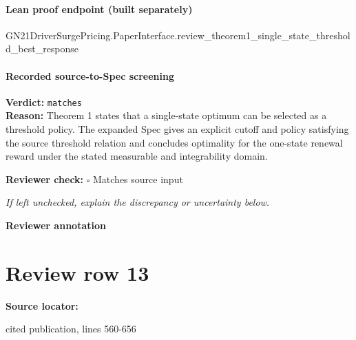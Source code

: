 \documentclass[10pt]{article}
\newcommand{\reviewerbox}{%
  \par\noindent\fbox{\parbox{0.96\linewidth}{\rule{0pt}{0.38in}}}\par
}
\newcommand{\reviewmatch}[1]{%
  \par\noindent\textbf{Reviewer check:} $\square$\; #1\par
  \noindent\emph{If left unchecked, explain the discrepancy or uncertainty below.}\par
}
\begin{document}
\paragraph{Lean proof endpoint (built separately)}\begin{ReviewVerbatim}
GN21DriverSurgePricing.PaperInterface.review_theorem1_single_state_threshold_best_response
\end{ReviewVerbatim}

\paragraph{Recorded source-to-Spec screening}
\textbf{Verdict:} \texttt{matches}
\\
\textbf{Reason:} Theorem 1 states that a single-state optimum can be selected as a threshold policy. The expanded Spec gives an explicit cutoff and policy satisfying the source threshold relation and concludes optimality for the one-state renewal reward under the stated measurable and integrability domain.
\reviewmatch{Matches source input}
\noindent\textbf{Reviewer annotation}\par
\reviewerbox
\clearpage
\hypertarget{source-claim-38fbb9f78eb2c2c7}{}
\section*{Review row 13}
\textbf{Source locator:} {\footnotesize\raggedright cited publication, lines 560-\allowbreak{}656\par}
\end{document}
